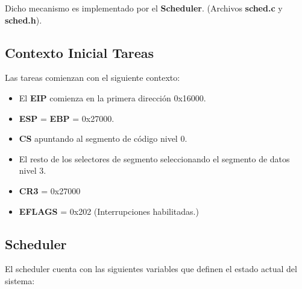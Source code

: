 \documentclass[a4paper]{article}
\begin{document}
Dicho mecanismo es implementado por el \textbf{Scheduler}.  (Archivos \textbf{sched.c} y \textbf{sched.h}).


\subsection{Contexto Inicial Tareas}
Las tareas comienzan con el siguiente contexto:
\begin{itemize}
	\item  El \textbf{EIP} comienza en la primera dirección 0x16000.
	\item \textbf{ESP} = \textbf{EBP} = 0x27000.
	\item \textbf{CS} apuntando al segmento de código nivel 0.
	\item El resto de los selectores de segmento seleccionando el segmento de datos nivel 3.
	\item \textbf{CR3} = 0x27000
	\item \textbf{EFLAGS} = 0x202 (Interrupciones habilitadas.)
\end{itemize}


\subsection{Scheduler}
El scheduler cuenta con las siguientes variables que definen el estado actual del sistema:
\end{document}
